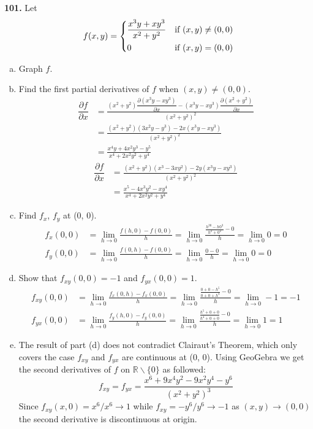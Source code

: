 \documentclass[a4paper,12pt]{article}
\newcommand{\tho}[3][]{\dfrac{\partial #1 #2}{\partial #3 #1}}
\newcommand{\exercise}[1]{\noindent\textbf{#1.}}
\begin{document}
\exercise{101} Let
\[f(x, y) = \begin{dcases}
  \frac{x^3y + xy^3}{x^2 + y^2} &\text{if } (x, y) \neq (0, 0)\\
  0 &\text{if } (x, y) = (0, 0)
\end{dcases}\]
\begin{enumerate}[(a)]
  \item Graph $f$.

  \item Find the first partial derivatives of $f$ when $(x, y) \neq (0, 0)$.
    \begin{align*}
      \tho{f}{x} &= \frac{(x^2 + y^2)\tho{(x^3y - xy^3)}{x}
      - (x^3y - xy^3)\tho{(x^2 + y^2)}{x}}{(x^2 + y^2)^2}\\
      &= \frac{(x^2 + y^2)(3x^2y - y^3) - 2x(x^3y - xy^3)}{(x^2 + y^2)^2}\\
      &= \frac{x^4y + 4x^2y^3 - y^5}{x^4 + 2x^2y^2 + y^4}
    \end{align*}
    \begin{align*}
      \tho{f}{x}
      &= \frac{(x^2 + y^2)(x^3 - 3xy^2) - 2y(x^3y - xy^3)}{(x^2 + y^2)^2}\\
      &= \frac{x^5 - 4x^3y^2 - xy^4}{x^4 + 2x^2y^2 + y^4}
    \end{align*}
  \item Find $f_x$, $f_y$ at (0, 0).
    \begin{align*}
      f_x(0, 0) &= \lim_{h\to 0}\frac{f(h, 0) - f(0, 0)}{h}
      = \lim_{h\to 0}\frac{\frac{h^30 - h0^3}{h^2 + 0^2} - 0}{h}
      = \lim_{h\to 0}0 = 0\\
      f_y(0, 0) &= \lim_{h\to 0}\frac{f(0, h) - f(0, 0)}{h}
      = \lim_{h\to 0}\frac{0 - 0}{h}
      = \lim_{h\to 0}0 = 0
    \end{align*}
  \item Show that $f_{xy}(0, 0) = -1$ and $f_{yx}(0, 0) = 1$.
    \begin{align*}
      f_{xy}(0, 0) &= \lim_{h\to 0}\frac{f_x(0, h) - f_x(0, 0)}{h}
      = \lim_{h\to 0}\frac{\frac{0 + 0 - h^5}{0 + 0 + h^4} - 0}{h}
      = \lim_{h\to 0}-1 = -1\\
      f_{yx}(0, 0) &= \lim_{h\to 0}\frac{f_y(h, 0) - f_y(0, 0)}{h}
      = \lim_{h\to 0}\frac{\frac{h^5 + 0 + 0}{h^4 + 0 + 0} - 0}{h}
      = \lim_{h\to 0}1 = 1
    \end{align*}
  \item The result of part (d) does not contradict Clairaut's Theorem,
    which only covers the case $f_{xy}$ and $f_{yx}$ are continuous at (0, 0).
    Using GeoGebra we get the second derivatives of $f$ on
    $\mathbb R\backslash\{0\}$ as followed:
    \[f_{xy} = f_{yx} = \frac{x^6 + 9x^4y^2 - 9x^2y^4 - y^6}{(x^2 + y^2)^3}\]
    Since $f_{xy}(x, 0) = x^6/x^6 \to 1$ while $f_{xy} = -y^6/y^6\to -1$
    as $(x, y) \to (0, 0)$ the second derivative is discontinuous at origin.
\end{enumerate}
\end{document}
